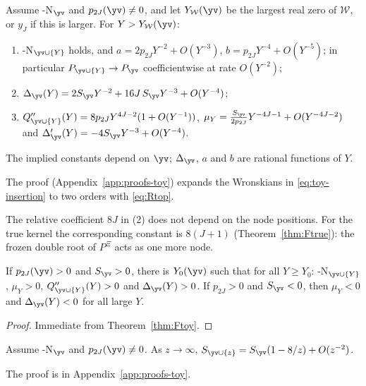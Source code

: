 \begin{theorem}\label{thm:Ftoy}
Assume \hyp{N}$_{\yv}$ and $p_{2J}(\yv)\neq0$, and let $Y_{\mathcal W}(\yv)$ be the largest real zero of $\mathcal W$, or
$y_J$ if this is larger. For $Y>Y_{\mathcal W}(\yv)$:
\begin{enumerate}[label=\textup{(\arabic*)}]
\item \hyp{N}$_{\yv\cup\{Y\}}$ holds, and $a=2p_{2J}Y^{-2}+O(Y^{-3})$, $b=p_{2J}Y^{-4}+O(Y^{-5})$; in particular
$P_{\yv\cup\{Y\}}\to P_{\yv}$ coefficientwise at rate $O(Y^{-2})$;
\item $\Delta_{\yv}(Y)=2S_{\yv}Y^{-2}+16J\,S_{\yv}Y^{-3}+O(Y^{-4})$;
\item $Q''_{\yv\cup\{Y\}}(Y)=8p_{2J}Y^{4J-2}(1+O(Y^{-1}))$, $\mu_Y=\frac{S_{\yv}}{2p_{2J}}Y^{-4J-1}+O(Y^{-4J-2})$ and
$\Delta_{\yv}'(Y)=-4S_{\yv}Y^{-3}+O(Y^{-4})$.
\end{enumerate}
The implied constants depend on $\yv$; $\Delta_{\yv}$, $a$ and $b$ are rational functions of $Y$.
\end{theorem}

The proof (Appendix~\ref{app:proofs-toy}) expands the Wronskians in \eqref{eq:toy-insertion} to two orders with
\eqref{eq:Rtop}.

The relative coefficient $8J$ in (2) does not depend on the node positions. For the true kernel the corresponding
constant is $8(J+1)$ (Theorem~\ref{thm:Ftrue}): the frozen double root of $P^{\Xi}$ acts as one more node.

\begin{corollary}\label{cor:Ftoy-signs}
If $p_{2J}(\yv)>0$ and $S_{\yv}>0$, there is $Y_0(\yv)$ such that for all $Y\ge Y_0$: \hyp{N}$_{\yv\cup\{Y\}}$,
$\mu_Y>0$, $Q''_{\yv\cup\{Y\}}(Y)>0$ and $\Delta_{\yv}(Y)>0$. If $p_{2J}>0$ and $S_{\yv}<0$, then $\mu_Y<0$ and
$\Delta_{\yv}(Y)<0$ for all large $Y$.
\end{corollary}

\begin{proof}
Immediate from Theorem~\ref{thm:Ftoy}.
\end{proof}

\begin{proposition}\label{prop:screening-toy}
Assume \hyp{N}$_{\yv}$ and $p_{2J}(\yv)\neq0$. As $z\to\infty$, $S_{\yv\cup\{z\}}=S_{\yv}(1-8/z)+O(z^{-2})$.
\end{proposition}

The proof is in Appendix~\ref{app:proofs-toy}.

